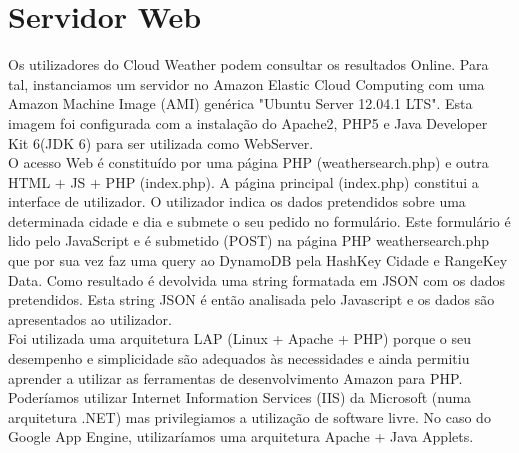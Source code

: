 \section{Servidor Web}
Os utilizadores do Cloud Weather podem consultar os resultados Online. Para tal, instanciamos um servidor no Amazon Elastic Cloud Computing com uma Amazon Machine Image (AMI) genérica "Ubuntu Server 12.04.1 LTS". Esta imagem foi configurada com a instalação do Apache2, PHP5 e Java Developer Kit 6(JDK 6) para ser utilizada como WebServer.\\
O acesso Web é constituído por uma página PHP (weathersearch.php) e outra HTML + JS + PHP (index.php). A página principal (index.php) constitui a interface de utilizador. O utilizador indica os dados pretendidos sobre uma determinada cidade e dia e submete o seu pedido no formulário. Este formulário é lido pelo JavaScript e é submetido (POST) na página PHP weathersearch.php que por sua vez faz uma query ao DynamoDB pela HashKey Cidade e RangeKey Data. Como resultado é devolvida uma string formatada em JSON com os dados pretendidos. Esta string JSON é então analisada pelo Javascript e os dados são apresentados ao utilizador.\\
Foi utilizada uma arquitetura LAP (Linux + Apache + PHP) porque o seu desempenho e simplicidade são adequados às necessidades e ainda permitiu aprender a utilizar as ferramentas de desenvolvimento Amazon para PHP.\\
Poderíamos utilizar Internet Information Services (IIS) da Microsoft (numa arquitetura .NET) mas privilegiamos  a utilização de software livre. No caso do Google App Engine, utilizaríamos uma arquitetura Apache + Java Applets. \\
\\
\\
